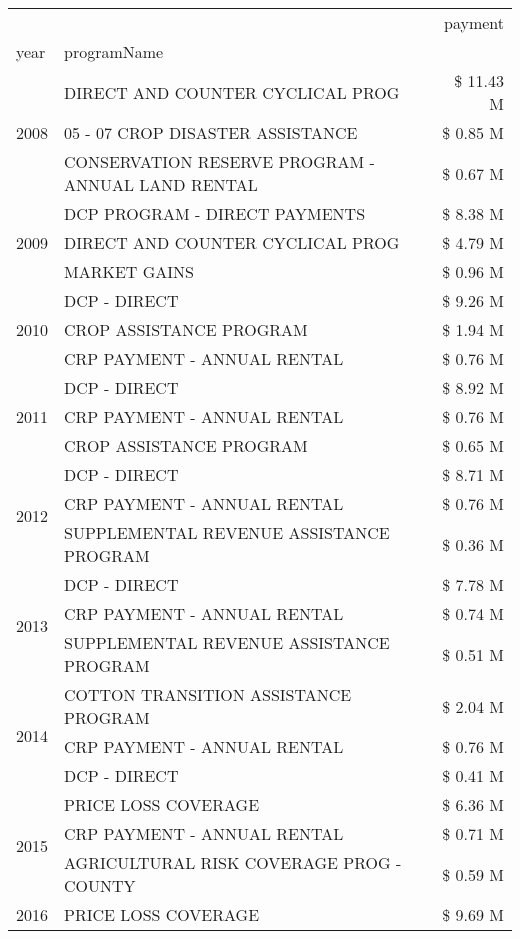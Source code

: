 \begin{tabular}{llr}
\toprule
 &  & payment \\
year & programName &  \\
\midrule
\multirow[t]{3}{*}{2008} & DIRECT AND COUNTER CYCLICAL PROG & \$ 11.43 M \\
 & 05 - 07 CROP DISASTER ASSISTANCE & \$ 0.85 M \\
 & CONSERVATION RESERVE PROGRAM - ANNUAL LAND RENTAL & \$ 0.67 M \\
\cline{1-3}
\multirow[t]{3}{*}{2009} & DCP PROGRAM - DIRECT PAYMENTS & \$ 8.38 M \\
 & DIRECT AND COUNTER CYCLICAL PROG & \$ 4.79 M \\
 & MARKET GAINS & \$ 0.96 M \\
\cline{1-3}
\multirow[t]{3}{*}{2010} & DCP - DIRECT & \$ 9.26 M \\
 & CROP ASSISTANCE PROGRAM & \$ 1.94 M \\
 & CRP PAYMENT - ANNUAL RENTAL & \$ 0.76 M \\
\cline{1-3}
\multirow[t]{3}{*}{2011} & DCP - DIRECT & \$ 8.92 M \\
 & CRP PAYMENT - ANNUAL RENTAL & \$ 0.76 M \\
 & CROP ASSISTANCE PROGRAM & \$ 0.65 M \\
\cline{1-3}
\multirow[t]{3}{*}{2012} & DCP - DIRECT & \$ 8.71 M \\
 & CRP PAYMENT - ANNUAL RENTAL & \$ 0.76 M \\
 & SUPPLEMENTAL REVENUE ASSISTANCE PROGRAM & \$ 0.36 M \\
\cline{1-3}
\multirow[t]{3}{*}{2013} & DCP - DIRECT & \$ 7.78 M \\
 & CRP PAYMENT - ANNUAL RENTAL & \$ 0.74 M \\
 & SUPPLEMENTAL REVENUE ASSISTANCE PROGRAM & \$ 0.51 M \\
\cline{1-3}
\multirow[t]{3}{*}{2014} & COTTON TRANSITION ASSISTANCE PROGRAM & \$ 2.04 M \\
 & CRP PAYMENT - ANNUAL RENTAL & \$ 0.76 M \\
 & DCP - DIRECT & \$ 0.41 M \\
\cline{1-3}
\multirow[t]{3}{*}{2015} & PRICE LOSS COVERAGE & \$ 6.36 M \\
 & CRP PAYMENT - ANNUAL RENTAL & \$ 0.71 M \\
 & AGRICULTURAL RISK COVERAGE PROG - COUNTY & \$ 0.59 M \\
\cline{1-3}
\multirow[t]{3}{*}{2016} & PRICE LOSS COVERAGE & \$ 9.69 M \\

\end{tabular}
